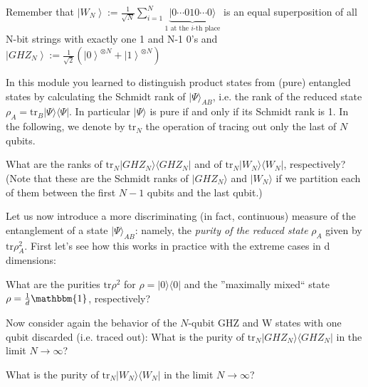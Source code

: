 \documentclass[a4paper,10pt,landscape,twocolumn]{scrartcl}
\newcommand{\ket}[1]{| #1 \rangle}
\newcommand{\bra}[1]{\langle #1 |}
\newcommand{\tr}{\mathrm{tr}}
\begin{document}
\begin{exercise}

Remember that $\left| W_ N \right\rangle := \frac{1}{\sqrt{N}}\sum_{i=1}^N \underset{1\text{ at the $i$-th place}}{\underbrace{\ket{0\cdots 010\cdots 0}}}$ is an equal superposition of all N-bit strings with exactly one 1 and N-1 0's and
$\left| GHZ_ N \right\rangle :=\frac{1}{\sqrt {2}} (\left| 0 \right\rangle ^{\otimes N}+\left| 1 \right\rangle ^{\otimes N})$

In this module you learned to distinguish product states from (pure) entangled states by calculating the Schmidt rank of $\ket{\Psi}_{AB}$, i.e. the rank of the reduced state $\rho_A=\tr_B \ket{\Psi}\bra{\Psi}$. In particular $\ket{\Psi}$ is pure if and only if its Schmidt rank is 1. In the following, we denote by $\tr_N$ the operation of tracing out only the last of $N$ qubits.

\begin{subex}
What are the ranks of $\tr_N \ket{GHZ_N}\bra{GHZ_N}$ and of $\tr_N \ket{W_N}\bra{W_N}$, respectively? (Note that these are the Schmidt ranks of $ \ket{GHZ_N}$ and  $\ket{W_N}$ if we partition each of them between the first $N-1$ qubits and the last qubit.)
\end{subex}

\begin{subex}
Let us now introduce a more discriminating (in fact, continuous) measure of the entanglement of a state $\ket{\Psi}_{AB}$: namely, the \emph{purity of the reduced state} $\rho_A$ given by $\tr \rho_A^2$. First let's see how this works in practice with the extreme cases in d dimensions:

What are the purities $\tr \rho^2$ for $\rho = \ket{0}\bra{0}$ and the ''maximally mixed`` state $\rho = \frac{1}{d} \mathbbm{1}$, respectively?
\end{subex}

\begin{subex}
Now consider again the behavior of the $N$-qubit GHZ and W states with one qubit discarded (i.e. traced out): What is the purity of $\tr_N \ket{GHZ_N}\bra{GHZ_N}$ in the limit $N\rightarrow \infty$?
\end{subex}

\begin{subex}
What is the purity of $\tr_N \ket{W_N}\bra{W_N}$ in the limit $N\rightarrow \infty$?
\end{subex}

\end{exercise}
\end{document}
